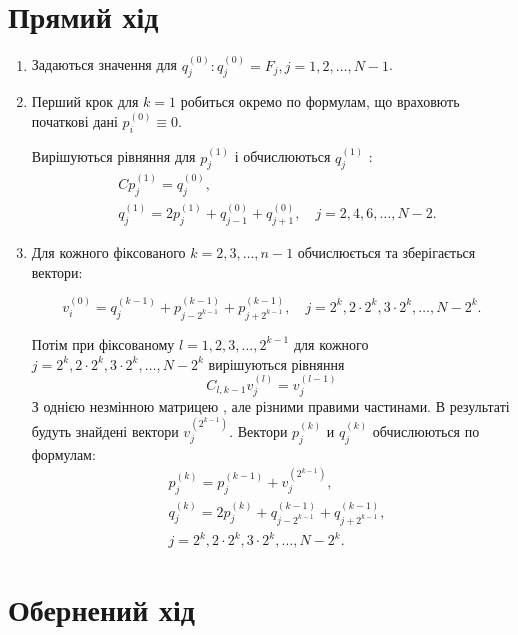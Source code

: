 \section{Прямий хід}

\begin{enumerate}

    \item Задаються значення для 
    $q_j^{(0)}: q_j^{(0)}=F_j, j=1,2, \ldots, N-1$.

    \item Перший крок для $k=1$ робиться окремо по формулам, що враховють 
    початкові дані $p_i^{(0)} \equiv 0$. 
    
    
    Вирішуються рівняння для $p_j^{(1)}$ і обчислюються $q_j^{(1)}$ :
    $$
    \begin{aligned}
    & C p_j^{(1)}=q_j^{(0)}, \\
    & q_j^{(1)}=2 p_j^{(1)}+q_{j-1}^{(0)}+q_{j+1}^{(0)}, \quad j=2,4,6, \ldots, N-2 .
    \end{aligned}
    $$

    \item Для кожного фіксованого $k=2,3, \ldots, n-1$ обчислюється 
    та зберігається вектори:


    $$
    v_i^{(0)}=q_j^{(k-1)}+p_{j-2^{k-1}}^{(k-1)}+p_{j+2^{k-1}}^{(k-1)}, \quad j=2^k, 2 \cdot 2^k, 3 \cdot 2^k, \ldots, N-2^k .
    $$

    Потім при фіксованому $l=1,2,3, \ldots, 2^{k-1}$ для кожного 
    $j=2^k, 2 \cdot 2^k, 3 \cdot 2^k, \ldots, N-2^k$ вирішуються рівняння
    $$
    C_{l, k-1} v_j^{(l)}=v_j^{(l-1)}
    $$
    З однією незмінною матрицею , але різними правими частинами. В результаті будуть знайдені вектори $v_j^{\left(2^{k-1}\right)}$. 
    Вектори $p_j^{(k)}$ и $q_j^{(k)}$ обчислюються по формулам:
    $$
    \begin{aligned}
    & p_j^{(k)}=p_j^{(k-1)}+v_j^{\left(2^{k-1}\right)}, \\
    & q_j^{(k)}=2 p_j^{(k)}+q_{j-2^{k-1}}^{(k-1)}+q_{j+2^{k-1}}^{(k-1)}, \\
    & j=2^k, 2 \cdot 2^k, 3 \cdot 2^k, \ldots, N-2^k .
    \end{aligned}
    $$

\end{enumerate}

\section{Обернений хід}


